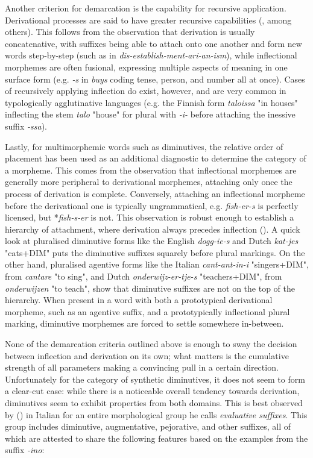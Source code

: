 Another criterion for demarcation is the capability for recursive application. Derivational processes are said to have greater recursive capabilities (\cite{Booij+2000}, among others). This follows from the observation that derivation is usually concatenative, with suffixes being able to attach onto one another and form new words step-by-step (such as in \textit{dis-establish-ment-ari-an-ism}), while inflectional morphemes are often fusional, expressing multiple aspects of meaning in one surface form (e.g. \textit{-s} in \textit{buys} coding tense, person, and number all at once). Cases of recursively applying inflection do exist, however, and are very common in typologically agglutinative languages (e.g. the Finnish form \textit{taloissa} "in houses" inflecting the stem \textit{talo} "house" for plural with \textit{-i-} before attaching the inessive suffix \textit{-ssa}). 

Lastly, for multimorphemic words such as diminutives, the relative order of placement has been used as an additional diagnostic to determine the category of a morpheme. This comes from the observation that inflectional morphemes are generally more peripheral to derivational morphemes, attaching only once the process of derivation is complete. Conversely, attaching an inflectional morpheme before the derivational one is typically ungrammatical, e.g. \textit{fish-er-s} is perfectly licensed, but *\textit{fish-s-er} is not. This observation is robust enough to establish a hierarchy of attachment, where derivation always precedes inflection (\cite{Booij+2000}). A quick look at pluralised diminutive forms like the English \textit{dogg-ie-s} and Dutch \textit{kat-jes} "cats+DIM" puts the diminutive suffixes squarely before plural markings. On the other hand, pluralised agentive forms like the Italian \textit{cant-ant-in-i} "singers+DIM", from \textit{cantare} "to sing", and Dutch \textit{onderwijz-er-tje-s} "teachers+DIM", from \textit{onderwijzen} "to teach", show that diminutive suffixes are not on the top of the hierarchy. When present in a word with both a prototypical derivational morpheme, such as an agentive suffix, and a prototypically inflectional plural marking, diminutive morphemes are forced to settle somewhere in-between.

None of the demarcation criteria outlined above is enough to sway the decision between inflection and derivation on its own; what matters is the cumulative strength of all parameters making a convincing pull in a certain direction. Unfortunately for the category of synthetic diminutives, it does not seem to form a clear-cut case: while there is a noticeable overall tendency towards derivation, diminutives seem to exhibit properties from both domains. This is best observed by \citeauthor{Scalise+1986} (\citeyear{Scalise+1986}) in Italian for an entire morphological group he calls \textit{evaluative suffixes}. This group includes diminutive, augmentative, pejorative, and other suffixes, all of which are attested to share the following features based on the examples from the suffix \textit{-ino}:

